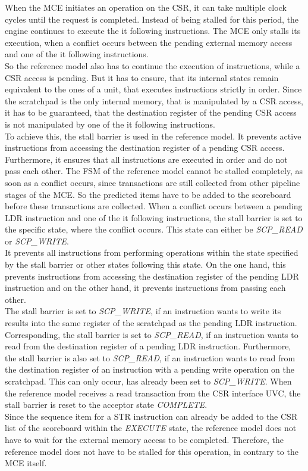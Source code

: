 When the MCE initiates an operation on the CSR, it can take multiple clock cycles until the request is completed.
Instead of being stalled for this period, the engine continues to execute the it following instructions.
The MCE only stalls its execution, when a conflict occurs between the pending external memory access and one of the it following instructions.\\
So the reference model also has to continue the execution of instructions, while a CSR access is pending.
But it has to ensure, that its internal states remain equivalent to the ones of a unit, that executes instructions strictly in order.
Since the scratchpad is the only internal memory, that is manipulated by a CSR access, it has to be guaranteed, that the destination register of the pending CSR
access is not manipulated by one of the it following instructions.\\
To achieve this, the stall barrier is used in the reference model. It prevents active instructions from accessing the destination register of a pending CSR
access. Furthermore, it ensures that all instructions are executed in order and do not pass each other.
The FSM of the reference model cannot be stalled completely, as soon as a conflict occurs, since transactions are still collected from other pipeline stages of
the MCE.
So the predicted items have to be added to the scoreboard before these transactions are collected.
When a conflict occurs between a pending LDR instruction and one of the it following instructions, the stall barrier is set to the specific state,
where the conflict occurs.
This state can either be \emph{SCP\_READ} or \emph{SCP\_WRITE}.\\
It prevents all instructions from performing operations within the state specified by the stall barrier or other states following this state.
On the one hand, this prevents instructions from accessing the destination register of the pending LDR instruction and on the other hand, it prevents
instructions from passing each other.\\
The stall barrier is set to \emph{SCP\_WRITE}, if an instruction wants to write its results into the same register of the scratchpad as the pending LDR
instruction.
Corresponding, the stall barrier is set to \emph{SCP\_READ}, if an instruction wants to read from the destination register of a pending LDR instruction.
Furthermore, the stall barrier is also set to \emph{SCP\_READ}, if an instruction wants to read from the destination register of an instruction with a pending
write operation on the scratchpad. This can only occur, has already been set to \emph{SCP\_WRITE}.
When the reference model receives a read transaction from the CSR interface UVC, the stall barrier is reset to the acceptor state \emph{COMPLETE}.\\
Since the sequence item for a STR instruction can already be added to the CSR list of the scoreboard within the \emph{EXECUTE} state, the reference model does
not have to wait for the external memory access to be completed.
Therefore, the reference model does not have to be stalled for this operation, in contrary to the MCE itself.

